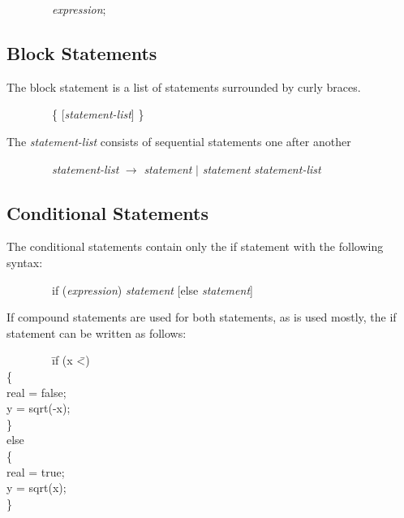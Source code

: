 \documentclass[12pt,psfig,a4]{article}
\begin{document}
\begin{code}
\begin{tabbing}
~~~~~~~~\textsl{expression};
\end{tabbing}
\end{code}

\subsection{Block Statements}
The block statement is a list of statements surrounded by curly braces.

\begin{code}
\begin{tabbing}
~~~~~~~~\{ [\textsl{statement-list}]
\}
\end{tabbing}
\end{code}

The \textsl{statement-list} consists of sequential statements one after another

\begin{code}
\begin{tabbing}
~~~~~~~~\textsl{statement-list}  $\rightarrow$ \textsl{statement} $\mid$ \textsl{statement} \textsl{statement-list}
\end{tabbing}
\end{code}

\subsection{Conditional Statements}
The conditional statements contain only the if statement with the following syntax:

\begin{code}
\begin{tabbing}
~~~~~~~~if (\textsl{expression}) \textsl{statement} [else \textsl{statement}]
\end{tabbing}
\end{code}

If compound statements are used for both statements, as is used mostly, the if statement can be written as follows:

\begin{code}
\begin{tabbing}
~~~~~~~~\= if (x \= \textless {}) \\
\> \{ \\
\> \> real = false; \\
\> \> y = sqrt(-x); \\
\> \} \\
\> else \\
\> \{ \\
\> \> real = true; \\
\> \> y = sqrt(x); \\
\> \}
\end{tabbing}
\end{code}
\end{document}
